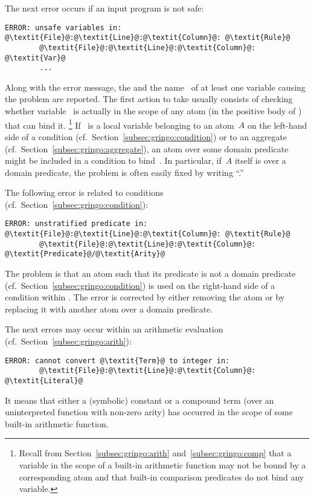 The next error occurs if an input program is not safe:
%
\begin{lstlisting}[numbers=none,escapechar=@]
ERROR: unsafe variables in:
@\textit{File}@:@\textit{Line}@:@\textit{Column}@: @\textit{Rule}@
        @\textit{File}@:@\textit{Line}@:@\textit{Column}@: @\textit{Var}@
        ...
\end{lstlisting}
%
Along with the error message, the  and the
name~ of at least one variable causing the problem
are reported.
The first action to take usually consists of checking whether
variable~ is actually in the scope of any atom
(in the positive body of ) that can bind it.%
\footnote{%
  Recall from Section~\ref{subsec:gringo:arith} and~\ref{subsec:gringo:comp}
  that a variable in the scope of a built-in arithmetic function may not be bound
  by a corresponding atom and that built-in comparison predicates do not bind
  any variable.}
If~ is a local variable belonging to an atom~$A$ 
on the left-hand side of a condition (cf.\ Section~\ref{subsec:gringo:condition})
or to an aggregate (cf.\ Section~\ref{subsec:gringo:aggregate}),
an atom over some domain predicate might be included in a condition
to bind~.
In particular, if~$A$ itself is over a domain predicate,
the problem is often easily fixed by writing ``.''

The following error is related to conditions
(cf.\ Section~\ref{subsec:gringo:condition}):
%
\begin{lstlisting}[numbers=none,escapechar=@]
ERROR: unstratified predicate in:
@\textit{File}@:@\textit{Line}@:@\textit{Column}@: @\textit{Rule}@
        @\textit{File}@:@\textit{Line}@:@\textit{Column}@: @\textit{Predicate}@/@\textit{Arity}@
\end{lstlisting}
%
The problem is that an atom  such
that its predicate  is not a domain predicate
(cf.\ Section~\ref{subsec:gringo:condition}) is used on the right-hand side of a condition
within .
The error is corrected by either removing the atom or
by replacing it with another atom over a domain predicate.

The next errors may occur within an arithmetic evaluation
(cf.\ Section~\ref{subsec:gringo:arith}):
%
\begin{lstlisting}[numbers=none,escapechar=@]
ERROR: cannot convert @\textit{Term}@ to integer in:
        @\textit{File}@:@\textit{Line}@:@\textit{Column}@: @\textit{Literal}@
\end{lstlisting}
%
It means that either a (symbolic) constant or a compound term
(over an uninterpreted function with non-zero arity)
has occurred in the scope of some built-in arithmetic function.


